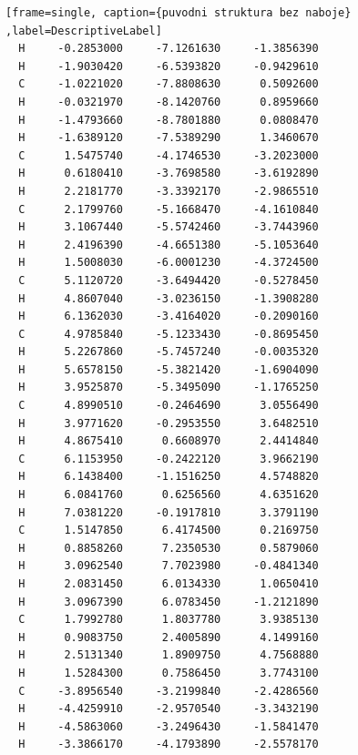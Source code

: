 \documentclass[
  digital, %
  table,   %
  lof,     %
  lot,     %
  oneside,
]{fithesis3}
\begin{document}
\begin{lstlisting}[frame=single, caption={puvodni struktura bez naboje} ,label=DescriptiveLabel]
  H     -0.2853000     -7.1261630     -1.3856390
  H     -1.9030420     -6.5393820     -0.9429610
  C     -1.0221020     -7.8808630      0.5092600
  H     -0.0321970     -8.1420760      0.8959660
  H     -1.4793660     -8.7801880      0.0808470
  H     -1.6389120     -7.5389290      1.3460670
  C      1.5475740     -4.1746530     -3.2023000
  H      0.6180410     -3.7698580     -3.6192890
  H      2.2181770     -3.3392170     -2.9865510
  C      2.1799760     -5.1668470     -4.1610840
  H      3.1067440     -5.5742460     -3.7443960
  H      2.4196390     -4.6651380     -5.1053640
  H      1.5008030     -6.0001230     -4.3724500
  C      5.1120720     -3.6494420     -0.5278450
  H      4.8607040     -3.0236150     -1.3908280
  H      6.1362030     -3.4164020     -0.2090160
  C      4.9785840     -5.1233430     -0.8695450
  H      5.2267860     -5.7457240     -0.0035320
  H      5.6578150     -5.3821420     -1.6904090
  H      3.9525870     -5.3495090     -1.1765250
  C      4.8990510     -0.2464690      3.0556490
  H      3.9771620     -0.2953550      3.6482510
  H      4.8675410      0.6608970      2.4414840
  C      6.1153950     -0.2422120      3.9662190
  H      6.1438400     -1.1516250      4.5748820
  H      6.0841760      0.6256560      4.6351620
  H      7.0381220     -0.1917810      3.3791190
  C      1.5147850      6.4174500      0.2169750
  H      0.8858260      7.2350530      0.5879060
  H      3.0962540      7.7023980     -0.4841340
  H      2.0831450      6.0134330      1.0650410
  H      3.0967390      6.0783450     -1.2121890
  C      1.7992780      1.8037780      3.9385130
  H      0.9083750      2.4005890      4.1499160
  H      2.5131340      1.8909750      4.7568880
  H      1.5284300      0.7586450      3.7743100
  C     -3.8956540     -3.2199840     -2.4286560
  H     -4.4259910     -2.9570540     -3.3432190
  H     -4.5863060     -3.2496430     -1.5841470
  H     -3.3866170     -4.1793890     -2.5578170

  \end{lstlisting}
\end{document}
